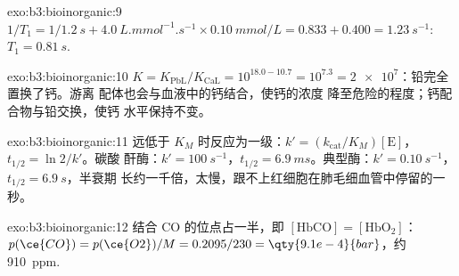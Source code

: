 \begin{solution}{exo:b3:bioinorganic:9}
$1/T_1 = 1/\qty{1.2}{s} + \qty{4.0}{L.mmol^{-1}.s^{-1}} \times \qty{0.10}{mmol/L} = 0.833 + 0.400 = \qty{1.23}{s^{-1}}$: $T_1 = \qty{0.81}{s}$.
\end{solution}

\begin{solution}{exo:b3:bioinorganic:10}
$K = K_{\mathrm{PbL}}/K_{\mathrm{CaL}} = 10^{18.0 - 10.7} = 10^{7.3} = \num{2e7}$：铅完全置换了钙。游离
配体也会与血液中的钙结合，使钙的浓度
降至危险的程度；钙配合物与铅交换，使钙
水平保持不变。
\end{solution}

\begin{solution}{exo:b3:bioinorganic:11}
远低于 $K_M$ 时反应为一级：$k' = (k_{\mathrm{cat}}/K_M)[\mathrm E]$，$t_{1/2} = \ln 2/k'$。碳酸
酐酶：$k' = \qty{100}{s^{-1}}$，$t_{1/2} = \qty{6.9}{ms}$。典型酶：$k' = \qty{0.10}{s^{-1}}$，$t_{1/2} = \qty{6.9}{s}$，半衰期
长约一千倍，太慢，跟不上红细胞在肺毛细血管中停留的一秒。
\end{solution}

\begin{solution}{exo:b3:bioinorganic:12}
结合 CO 的位点占一半，即 $[\mathrm{HbCO}] = [\mathrm{HbO_2}]$：$p(\ce{CO}) = p(\ce{O2})/M = 0.2095/230 = \qty{9.1e-4}{bar}$，约
\qty{910}{ppm}.
\end{solution}

